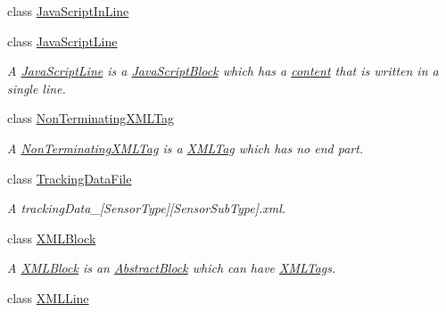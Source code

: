\begin{DoxyCompactItemize}
class \hyperlink{class_a_rdev_kit_1_1_model_1_1_project_1_1_file_1_1_java_script_in_line}{Java\-Script\-In\-Line}
\item 
class \hyperlink{class_a_rdev_kit_1_1_model_1_1_project_1_1_file_1_1_java_script_line}{Java\-Script\-Line}
\begin{DoxyCompactList}\small\item\em A \hyperlink{class_a_rdev_kit_1_1_model_1_1_project_1_1_file_1_1_java_script_line}{Java\-Script\-Line} is a \hyperlink{class_a_rdev_kit_1_1_model_1_1_project_1_1_file_1_1_java_script_block}{Java\-Script\-Block} which has a \hyperlink{class_a_rdev_kit_1_1_model_1_1_project_1_1_file_1_1_java_script_line_ac13eaaa9582b295e64a38594f11abb6e}{content} that is written in a single line. \end{DoxyCompactList}\item 
class \hyperlink{class_a_rdev_kit_1_1_model_1_1_project_1_1_file_1_1_non_terminating_x_m_l_tag}{Non\-Terminating\-X\-M\-L\-Tag}
\begin{DoxyCompactList}\small\item\em A \hyperlink{class_a_rdev_kit_1_1_model_1_1_project_1_1_file_1_1_non_terminating_x_m_l_tag}{Non\-Terminating\-X\-M\-L\-Tag} is a \hyperlink{class_a_rdev_kit_1_1_model_1_1_project_1_1_file_1_1_x_m_l_tag}{X\-M\-L\-Tag} which has no end part. \end{DoxyCompactList}\item 
class \hyperlink{class_a_rdev_kit_1_1_model_1_1_project_1_1_file_1_1_tracking_data_file}{Tracking\-Data\-File}
\begin{DoxyCompactList}\small\item\em A tracking\-Data\-\_\-\mbox{[}Sensor\-Type\mbox{]}\mbox{[}Sensor\-Sub\-Type\mbox{]}.xml. \end{DoxyCompactList}\item 
class \hyperlink{class_a_rdev_kit_1_1_model_1_1_project_1_1_file_1_1_x_m_l_block}{X\-M\-L\-Block}
\begin{DoxyCompactList}\small\item\em A \hyperlink{class_a_rdev_kit_1_1_model_1_1_project_1_1_file_1_1_x_m_l_block}{X\-M\-L\-Block} is an \hyperlink{class_a_rdev_kit_1_1_model_1_1_project_1_1_file_1_1_abstract_block}{Abstract\-Block} which can have \hyperlink{class_a_rdev_kit_1_1_model_1_1_project_1_1_file_1_1_x_m_l_tag}{X\-M\-L\-Tag}s. \end{DoxyCompactList}\item 
class \hyperlink{class_a_rdev_kit_1_1_model_1_1_project_1_1_file_1_1_x_m_l_line}{X\-M\-L\-Line}

\end{DoxyCompactItemize}
